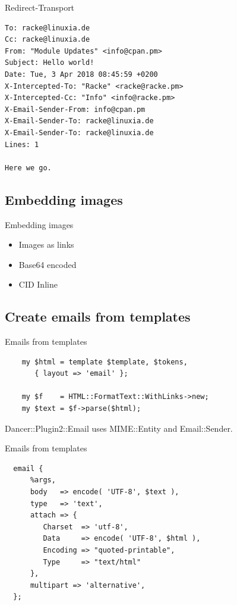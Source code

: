 \begin{frame}[fragile]{Redirect-Transport}
\begin{lstlisting}
To: racke@linuxia.de
Cc: racke@linuxia.de
From: "Module Updates" <info@cpan.pm>
Subject: Hello world!
Date: Tue, 3 Apr 2018 08:45:59 +0200
X-Intercepted-To: "Racke" <racke@racke.pm>
X-Intercepted-Cc: "Info" <info@racke.pm>
X-Email-Sender-From: info@cpan.pm
X-Email-Sender-To: racke@linuxia.de
X-Email-Sender-To: racke@linuxia.de
Lines: 1

Here we go.
\end{lstlisting}
\end{frame}

\subsection{Embedding images}

\begin{frame}{Embedding images}
  \begin{itemize}
  \item Images as links
  \item Base64 encoded
  \item CID Inline
  \end{itemize}
\end{frame}


\subsection{Create emails from templates}

\begin{frame}[fragile]{Emails from templates}
  \begin{verbatim}
    my $html = template $template, $tokens,
       { layout => 'email' };

    my $f    = HTML::FormatText::WithLinks->new;
    my $text = $f->parse($html);
  \end{verbatim}
\end{frame}

Dancer::Plugin2::Email uses MIME::Entity and Email::Sender.

\begin{frame}[fragile]{Emails from templates}
\begin{verbatim}
  email {
      %args,
      body   => encode( 'UTF-8', $text ),
      type   => 'text',
      attach => {
         Charset  => 'utf-8',
         Data     => encode( 'UTF-8', $html ),
         Encoding => "quoted-printable",
         Type     => "text/html"
      },
      multipart => 'alternative',
  };
\end{verbatim}
\end{frame}

